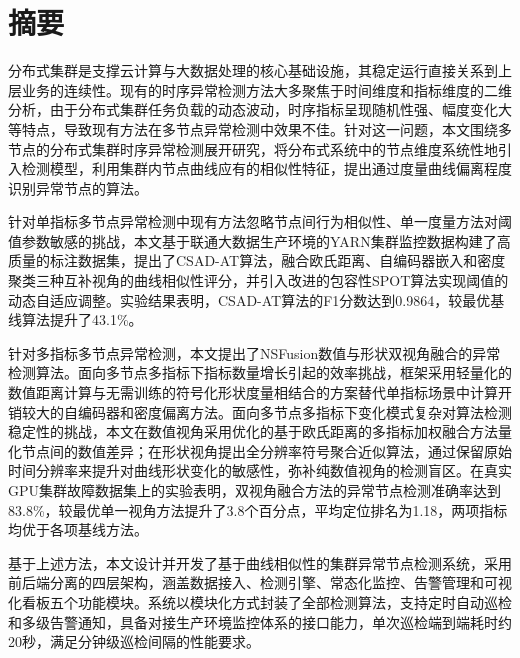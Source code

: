 
\maketitle%
\MAKETITLE%
\makedeclaration%
\intobmk\chapter*{摘\quad 要}%
\setcounter{page}{1}%

分布式集群是支撑云计算与大数据处理的核心基础设施，其稳定运行直接关系到上层业务的连续性。现有的时序异常检测方法大多聚焦于时间维度和指标维度的二维分析，由于分布式集群任务负载的动态波动，时序指标呈现随机性强、幅度变化大等特点，导致现有方法在多节点异常检测中效果不佳。针对这一问题，本文围绕多节点的分布式集群时序异常检测展开研究，将分布式系统中的节点维度系统性地引入检测模型，利用集群内节点曲线应有的相似性特征，提出通过度量曲线偏离程度识别异常节点的算法。

针对单指标多节点异常检测中现有方法忽略节点间行为相似性、单一度量方法对阈值参数敏感的挑战，本文基于联通大数据生产环境的YARN集群监控数据构建了高质量的标注数据集，提出了CSAD-AT算法，融合欧氏距离、自编码器嵌入和密度聚类三种互补视角的曲线相似性评分，并引入改进的包容性SPOT算法实现阈值的动态自适应调整。实验结果表明，CSAD-AT算法的F1分数达到0.9864，较最优基线算法提升了43.1\%。

针对多指标多节点异常检测，本文提出了NSFusion数值与形状双视角融合的异常检测算法。面向多节点多指标下指标数量增长引起的效率挑战，框架采用轻量化的数值距离计算与无需训练的符号化形状度量相结合的方案替代单指标场景中计算开销较大的自编码器和密度偏离方法。面向多节点多指标下变化模式复杂对算法检测稳定性的挑战，本文在数值视角采用优化的基于欧氏距离的多指标加权融合方法量化节点间的数值差异；在形状视角提出全分辨率符号聚合近似算法，通过保留原始时间分辨率来提升对曲线形状变化的敏感性，弥补纯数值视角的检测盲区。在真实GPU集群故障数据集上的实验表明，双视角融合方法的异常节点检测准确率达到83.8\%，较最优单一视角方法提升了3.8个百分点，平均定位排名为1.18，两项指标均优于各项基线方法。

基于上述方法，本文设计并开发了基于曲线相似性的集群异常节点检测系统，采用前后端分离的四层架构，涵盖数据接入、检测引擎、常态化监控、告警管理和可视化看板五个功能模块。系统以模块化方式封装了全部检测算法，支持定时自动巡检和多级告警通知，具备对接生产环境监控体系的接口能力，单次巡检端到端耗时约20秒，满足分钟级巡检间隔的性能要求。

